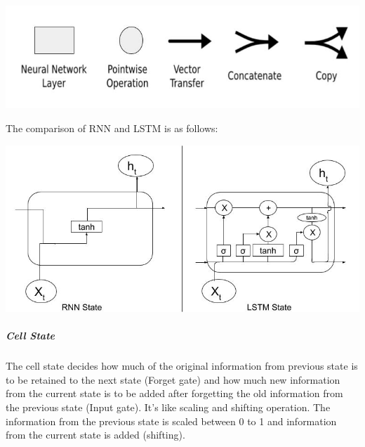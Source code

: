 				\begin{center}
				\includegraphics[width=\linewidth]{figures/Notations.jpg}	
				\label{fig: Notations}
				\end{center}

The comparison of RNN and LSTM is as follows:

				\begin{center}
				\includegraphics[width=\linewidth]{figures/Comparison-of-RNN-and-LSTM-Cells.jpg}	
				\label{fig: Comparison of RNN and LSTM State}
				\end{center}

\subparagraph{Cell State}

The cell state decides how much of the original information from previous state is to be retained to the next state (Forget gate) and how much new information from the current state is to be added after forgetting the old information from the previous state (Input gate). It's like scaling and shifting operation. The information from the previous state is scaled between 0 to 1 and information from the current state is added (shifting).

